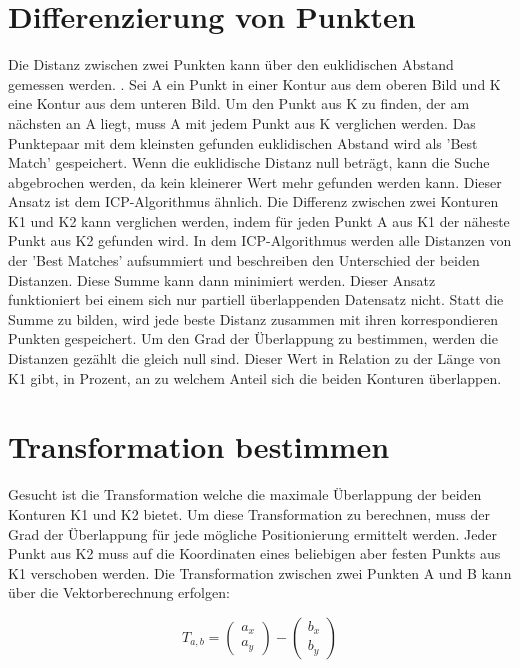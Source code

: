 \section{Differenzierung von Punkten}

Die Distanz zwischen zwei Punkten kann über den euklidischen Abstand gemessen werden.
\cite{Dokmanic.2015}. Sei A ein Punkt in einer Kontur aus dem oberen Bild und K eine 
Kontur aus dem unteren Bild.  
Um den Punkt aus K zu finden, der am nächsten an A liegt, muss A mit jedem Punkt aus 
K verglichen werden. Das Punktepaar mit dem kleinsten gefunden euklidischen Abstand 
wird als 'Best Match' gespeichert. Wenn die euklidische Distanz null beträgt, kann 
die Suche abgebrochen werden, da kein kleinerer Wert mehr gefunden werden kann.
Dieser Ansatz ist dem ICP-Algorithmus ähnlich. Die Differenz zwischen zwei Konturen 
K1 und K2 kann verglichen werden, indem für jeden Punkt A aus K1 der näheste Punkt aus 
K2 gefunden wird. In dem ICP-Algorithmus werden alle Distanzen von der 'Best Matches' 
aufsummiert und beschreiben den Unterschied der beiden Distanzen. Diese Summe kann dann 
minimiert werden. Dieser Ansatz funktioniert bei einem sich nur partiell
überlappenden Datensatz nicht. 
Statt die Summe zu bilden, wird jede beste Distanz zusammen mit ihren korrespondieren 
Punkten gespeichert. Um den Grad der Überlappung zu bestimmen, werden die Distanzen 
gezählt die gleich null sind. Dieser Wert in Relation zu der Länge von K1 gibt, 
in Prozent, an zu welchem Anteil sich die beiden Konturen überlappen.

\section{Transformation bestimmen}

Gesucht ist die Transformation welche die maximale Überlappung der beiden 
Konturen K1 und K2 bietet. Um diese Transformation zu berechnen, muss der 
Grad der Überlappung für jede mögliche Positionierung ermittelt werden. Jeder
Punkt aus K2 muss auf die Koordinaten eines beliebigen aber festen Punkts aus K1 
verschoben werden.
Die Transformation zwischen zwei Punkten A und B kann über die Vektorberechnung erfolgen:

\begin{equation*}
    T_{a,b} = \begin{pmatrix}a_x\\a_y\end{pmatrix} - \begin{pmatrix}b_x\\b_y\end{pmatrix}
\end{equation*}


